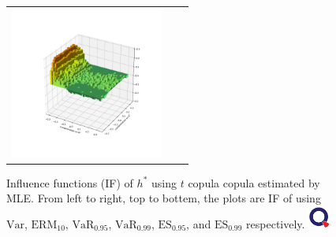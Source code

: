 \begin{figure}[h!t]
\begin{tabular}[width=20cm, height=20cm]{ccc}
   \includegraphics[height=5cm]{_pics/IF_plots/ES1_t_copula_MLE.pdf}
   \end{tabular}
   \caption{Influence functions (IF) of $h^*$ using $t$ copula copula estimated by MLE. From left to right, top to bottem, the plots are
   IF of using $\text{Var}$, $\text{ERM}_{10}$, $\text{VaR}_{0.95}$, $\text{VaR}_{0.99}$, $\text{ES}_{0.95}$, and $\text{ES}_{0.99}$ respectively.
   \href{http://www.quantlet.com/}{\includegraphics[width=20pt]{_pics/qletlogo_tr.png}}}
   \label{fig:IFs}
\end{figure}

